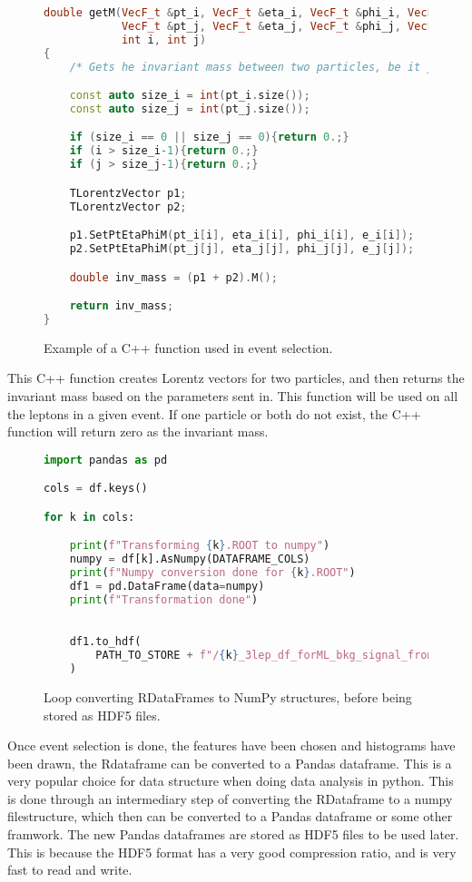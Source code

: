 \begin{figure}[H]
    \centering
\begin{lstlisting}[language=C++, style=cppstyle, label={code:cpp_func_example}]
double getM(VecF_t &pt_i, VecF_t &eta_i, VecF_t &phi_i, VecF_t &e_i,
            VecF_t &pt_j, VecF_t &eta_j, VecF_t &phi_j, VecF_t &e_j,
            int i, int j)
{
    /* Gets he invariant mass between two particles, be it jets or leptons */

    const auto size_i = int(pt_i.size());
    const auto size_j = int(pt_j.size());

    if (size_i == 0 || size_j == 0){return 0.;}
    if (i > size_i-1){return 0.;}
    if (j > size_j-1){return 0.;}

    TLorentzVector p1;
    TLorentzVector p2;

    p1.SetPtEtaPhiM(pt_i[i], eta_i[i], phi_i[i], e_i[i]);
    p2.SetPtEtaPhiM(pt_j[j], eta_j[j], phi_j[j], e_j[j]);

    double inv_mass = (p1 + p2).M();

    return inv_mass;
}
\end{lstlisting}
\caption[C++ function example]{Example of a C++ function used in event selection.}
\end{figure}
This C++ function creates Lorentz vectors for two particles, and then returns the invariant mass based on the parameters sent in. 
This function will be used on all the leptons in a given event. If one particle or both do not exist, the C++ function will
return zero as the invariant mass. \par

\begin{figure}[H]
    \centering
\begin{lstlisting}[language=Python, style=pythonstyle, label={code:python_func_example_2}]
import pandas as pd 

cols = df.keys()

for k in cols:

    print(f"Transforming {k}.ROOT to numpy")
    numpy = df[k].AsNumpy(DATAFRAME_COLS)
    print(f"Numpy conversion done for {k}.ROOT")
    df1 = pd.DataFrame(data=numpy)
    print(f"Transformation done")
    

    df1.to_hdf(
        PATH_TO_STORE + f"/{k}_3lep_df_forML_bkg_signal_fromRDF.hdf5", "mini"
    )

\end{lstlisting}
\caption[Conversion from RDataFrame to NumPy]{Loop converting RDataFrames to NumPy structures, before being stored as HDF5 files.}
\end{figure}
Once event selection is done, the features have been chosen and histograms have been 
drawn, the Rdataframe can be converted to a Pandas dataframe. This is a very popular 
choice for data structure when doing data analysis in python. This is done through an 
intermediary step of converting the RDataframe to a numpy filestructure, which then can 
be converted to a Pandas\cite{reback2020pandas} dataframe or some other framwork.
The new Pandas dataframes are stored as HDF5\cite{hdf5} files to be used later. This is 
because the HDF5 format has a very good compression ratio, and is very fast to read and write. 